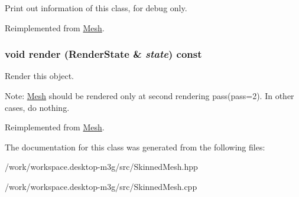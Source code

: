 Print out information of this class, for debug only. 

Reimplemented from \hyperlink{classm3g_1_1Mesh_6fea17fa1532df3794f8cb39cb4f911f}{Mesh}.\hypertarget{classm3g_1_1SkinnedMesh_8babc8a79b78615da51161e94029eea9}{
\subsubsection[{render}]{\setlength{\rightskip}{0pt plus 5cm}void render ({\bf RenderState} \& {\em state}) const}}
\label{classm3g_1_1SkinnedMesh_8babc8a79b78615da51161e94029eea9}


Render this object.

Note: \hyperlink{classm3g_1_1Mesh}{Mesh} should be rendered only at second rendering pass(pass=2). In other cases, do nothing. 

Reimplemented from \hyperlink{classm3g_1_1Mesh_8babc8a79b78615da51161e94029eea9}{Mesh}.

The documentation for this class was generated from the following files:\begin{CompactItemize}
\item 
/work/workspace.desktop-m3g/src/SkinnedMesh.hpp\item 
/work/workspace.desktop-m3g/src/SkinnedMesh.cpp\end{CompactItemize}
